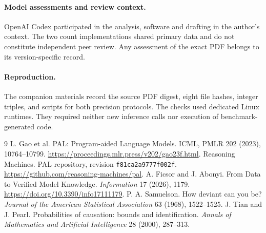 \documentclass[10pt]{article}
\begin{document}
\paragraph{Model assessments and review context.} OpenAI Codex participated in the analysis, software and drafting in the author's context. The two count implementations shared primary data and do not constitute independent peer review. Any assessment of the exact PDF belongs to its version-specific record.

\paragraph{Reproduction.} The companion materials record the source PDF digest, eight file hashes, integer triples, and scripts for both precision protocols. The checks used dedicated Linux runtimes. They required neither new inference calls nor execution of benchmark-generated code.
\begin{thebibliography}{9}
 L. Gao et al. PAL: Program-aided Language Models. ICML, PMLR 202 (2023), 10764--10799. \url{https://proceedings.mlr.press/v202/gao23f.html}.
 Reasoning Machines. PAL repository, revision \texttt{f81ca2a9777f002f}. \url{https://github.com/reasoning-machines/pal}.
 A. Ficsor and J. Abonyi. From Data to Verified Model Knowledge. \emph{Information} 17 (2026), 1179. \url{https://doi.org/10.3390/info17111179}.
 P. A. Samuelson. How deviant can you be? \emph{Journal of the American Statistical Association} 63 (1968), 1522--1525.
 J. Tian and J. Pearl. Probabilities of causation: bounds and identification. \emph{Annals of Mathematics and Artificial Intelligence} 28 (2000), 287--313.
\end{thebibliography}
\end{document}
